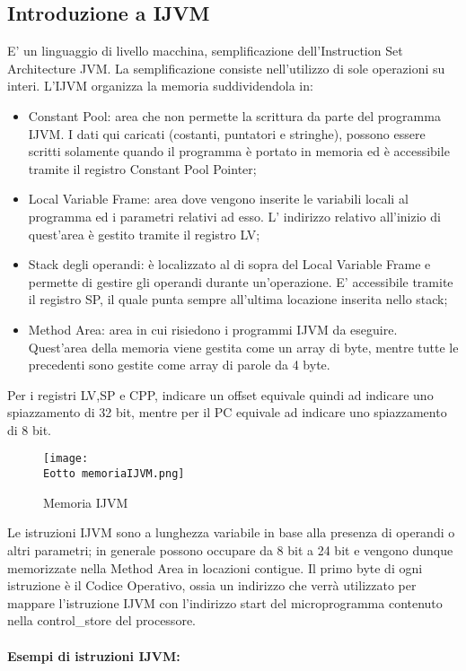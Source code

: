 \documentclass[12pt]{article}
\def \Eotto {Allegati/Esercizio8/}
\begin{document}
\subsection{Introduzione a IJVM}
E’ un linguaggio di livello macchina, semplificazione dell’Instruction Set Architecture JVM. La semplificazione consiste nell’utilizzo di sole operazioni su interi. L’IJVM organizza la memoria suddividendola in:
\begin{itemize}
    \item Constant Pool: area che non permette la scrittura da parte del programma IJVM. I dati qui caricati (costanti, puntatori e stringhe), possono essere scritti solamente quando il programma è portato in memoria ed è accessibile tramite il registro Constant Pool Pointer;
    \item Local Variable Frame: area dove vengono inserite le variabili locali al programma ed i parametri relativi ad esso. L’ indirizzo relativo all’inizio di quest’area è gestito tramite il registro LV;
    \item Stack degli operandi: è localizzato al di sopra del Local Variable Frame e permette di gestire gli operandi durante un’operazione. E’ accessibile tramite il registro SP, il quale punta sempre all’ultima locazione inserita nello stack;
    \item Method Area: area in cui risiedono i programmi IJVM da eseguire. Quest’area della memoria viene gestita come un array di byte, mentre tutte le precedenti sono gestite come array di parole da 4 byte.
\end{itemize}
Per i registri LV,SP e CPP, indicare un offset equivale quindi ad indicare uno spiazzamento di 32 bit, mentre per il PC equivale ad indicare uno spiazzamento di 8 bit.
\clearpage
\begin{figure}[ht!]
    \centering
    \texttt{[image: \\Eotto memoriaIJVM.png]}
    \caption{Memoria IJVM}
\end{figure}
Le istruzioni IJVM sono a lunghezza variabile in base alla presenza di operandi o altri parametri; in generale possono occupare da 8 bit a 24 bit e vengono dunque memorizzate nella Method Area in locazioni contigue. Il primo byte di ogni istruzione è il Codice Operativo, ossia un indirizzo che verrà utilizzato per mappare l’istruzione IJVM con l’indirizzo start del microprogramma contenuto nella control\_store del processore.
\\\\{\large \textbf{Esempi di istruzioni IJVM:}}
\end{document}
